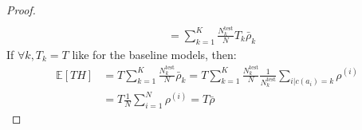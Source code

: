 \begin{proof}
\begin{align*}
        \\
        &= \sum_{k=1}^{K}{\frac{N_k^{\text{test}}}{N} T_k \bar{\rho}_k}%
    \end{align*}
    If $\forall k, T_k = T$ like for the baseline models, then:
    \begin{align*}
        \mathbb{E}[T H] &= T \sum_{k=1}^{K}{\frac{N_k^{\text{test}}}{N} \bar{\rho}_k}%
        = T \sum_{k=1}^{K}{\frac{N_k^{\text{test}}}{N} \frac{1}{N_k^{\text{test}}}\sum_{i | c(a_i)=k}{\rho^{(i)}}}%
        \\
        &= T \frac{1}{N} \sum_{i=1}^{N}{\rho^{(i)}}%
        = T \bar{\rho}%
    \end{align*}
\end{proof}

